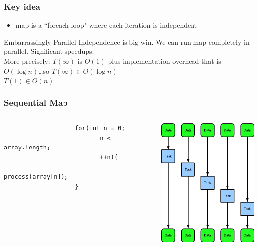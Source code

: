 \documentclass[xcolor=dvipsnames]{beamer}
\begin{document}
		\begin{frame} \frametitle{Key idea}
			\begin{itemize}
				\item map is a ``foreach loop" \pause 
				\alert{where each iteration is independent} \pause
			\end{itemize}
			\begin{block}{Embarrassingly Parallel}
			Independence is big win.  We can run map completely in parallel.
			Significant speedups:\\More precisely: $T(\infty)$ is  $O(1)$ plus
			implementation overhead that is $O(\log{n})$\ldots so $T(\infty)
			\in O(\log n)$\\$T(1) \in O(n)$
			\end{block}
		\end{frame}
			
		\begin{frame}[fragile] \frametitle{Sequential Map}
			\begin{columns}
				\begin{column}{0.5\textwidth}
					\begin{verbatim}
					for(int n = 0;
						   n < array.length;
						   ++n){
						        process(array[n]);
					}
					\end{verbatim}
			    \end{column}
	  			\begin{column}{0.5\textwidth}
					\includegraphics[width=60mm]{images/map_serial.png}
			    \end{column}
			\end{columns}
		\end{frame}
			
\end{document}
